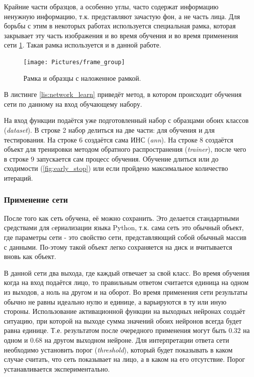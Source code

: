 \documentclass[12pt]{report}
\begin{document}
Крайние части образцов, а особенно углы, часто содержат информацию ненужную информацию, т.к. представляют зачастую 
фон, а не часть лица. Для борьбы с этим в некоторых работах используется специальная рамка, которая закрывает эту 
часть изображения и во время обучения и во время применения сети \ref{fig:frame}. Такая рамка используется и в 
данной 
работе.

\begin{figure}[h]
	\centering
	\texttt{[image: Pictures/frame\_group]}
	\caption{Рамка и образцы с наложенное рамкой.}
	\label{fig:frame}
\end{figure}

В листинге \ref{lis:network_learn} приведёт метод, в котором происходит обучения сети по данному на вход обучающему 
набору.
\lstset{caption=Обучение сети на основе данного обучающего набора.,
label=lis:network_learn,
basicstyle=\footnotesize\ttfamily,
captionpos=b,
breaklines=true,
breakatwhitespace=false,
numbers=left,
numbersep=5pt,
language=Python,
}


На вход функции подаётся уже подготовленный набор с образцами обоих классов (\textit{dataset}). В строке 2 набор 
делиться на две части: для обучения и для тестирования. На строке 6 создаётся сама ИНС (\textit{ann}). На строке 8 
создаётся объект для тренировки методом обратного распространения (\textit{trainer}), после чего в строке 9 
запускается сам процесс обучения. Обучение длиться или до сходимости (\ref{fig:early_stop}) или если пройдено 
максимальное количество итераций.

\subsubsection{Применение сети}
После того как сеть обучена, её можно сохранить. Это делается стандартными средствами для cериализации языка 
Python, 
т.к. сама сеть это обычный объект, где параметры сети - это свойство сети, представляющий собой обычный массив с 
данными. По-этому такой объект легко сохраняется на диск и вчитывается вновь как объект.

В данной сети два выхода, где каждый отвечает за свой класс. Во время обучения когда на вход подаётся лицо, то 
правильным ответом считается единица на одном из выходов, а ноль на другом и на оборот. Во время применения сети 
результаты обычно не равны идеально нулю и единице, а варьируются в ту или иную стороны. Использование 
активационной 
функции на выходных нейронах создаёт ситуацию, при которой на выходе сумма значений обоих нейронов всегда будет 
равна 
единице. Т.е. результатом после очередного применения могут быть $0.32$ на одном и $0.68$ на другом выходном 
нейроне.   
Для интерпретации ответа сети необходимо установить порог (\textit{threshold}), который будет показывать в каком 
случае считать, что сеть показывает на лицо, а в каком на его отсутствие. Порог устанавливается экспериментально.
\end{document}
